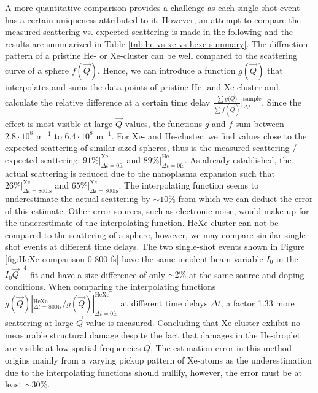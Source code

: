 A more quantitative comparison provides a challenge as each single-shot event has a certain uniqueness attributed to it. However, an attempt to compare the measured scattering vs. expected scattering is made in the following and the results are summarized in Table \ref{tab:he-vs-xe-vs-hexe-summary}. The diffraction pattern of a pristine He- or Xe-cluster can be well compared to the scattering curve of a sphere $f(\vec{Q})$. Hence, we can introduce a function $g(\vec{Q})$ that interpolates and sums the data points of pristine He- and Xe-cluster and calculate the relative difference at a certain time delay $\tfrac{\sum{g(\vec{Q}})}{\sum{f(\vec{Q})}}|_{\Delta t}^{\text{sample}}$. Since the effect is most visible at large $\vec{Q}$-values, the functions $g$ and $f$ sum between $2.8\cdot 10^{8}$ m$^{-1}$ to $6.4\cdot 10^{8}$ m$^{-1}$. For Xe- and He-cluster, we find values close to the expected scattering of similar sized spheres, thus is the measured scattering / expected scattering: $91 \% |_{\Delta t = 0 \text{fs}}^{\text{Xe}}$ and $89 \%|_{\Delta t=0 \text{fs}}^{\text{He}}$. As already established, the actual scattering is reduced due to the nanoplasma expansion such that $26 \% |_{\Delta t = 800 \text{fs}}^{\text{Xe}}$ and $65 \% |_{\Delta t = 800 \text{fs}}^{\text{Xe}}$. The interpolating function seems to underestimate the actual scattering by $\sim 10\%$ from which we can deduct the error of this estimate. Other error sources, such as electronic noise, would make up for the underestimate of the interpolating function. HeXe-cluster can not be compared to the scattering of a sphere, however, we may compare similar single-shot events at different time delays. The two single-shot events shown in Figure \ref{fig:HeXe-comparison-0-800-fs} have the same incident beam variable $I_{0}$ in the $I_{0} \vec{Q}^{-4}$ fit and have a size difference of only $\sim 2\%$ at the same source and doping conditions. When comparing the interpolating functions $g(\vec{Q}) |_{\Delta t = 800 \text{fs}}^{\text{HeXe}}/g(\vec{Q}) |_{\Delta t = 0 \text{fs}}^{\text{HeXe}}$ at different time delays $\Delta t$, a factor 1.33 more scattering at large $\vec{Q}$-value is measured. Concluding that Xe-cluster exhibit no measurable structural damage despite the fact that damages in the He-droplet are visible at low spatial frequencies $\vec{Q}$. The estimation error in this method origins mainly from a varying pickup pattern of Xe-atoms as the underestimation due to the interpolating functions should nullify, however, the error must be at least $\sim 30 \%$.\\
